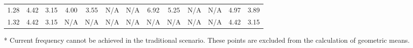 \documentclass[prodmode,acmtrets]{acmsmall} %
\begin{document}
\begin{table}[tbp]
{\begin{threeparttable}
\begin{tabular}{|c|cc|cc|cc|cc|cc||cc|}
     1.28 & 4.42	& 3.15   & 4.00 &	3.55 &	 N/A\tnote{*}	    &   N/A\tnote{*}     &	6.92 &	 5.25  &	 N/A\tnote{*}	  & N/A\tnote{*} & 4.97& 3.89\\
     1.32 & 4.42	& 3.15   & N/A\tnote{*}	  &	 N/A\tnote{*}	    &	 N/A\tnote{*}	    &	 N/A\tnote{*}   & N/A\tnote{*}   & N/A\tnote{*}    &    N/A\tnote{*}   & N/A\tnote{*} & 4.42	& 3.15 \\
     \hline
   \end{tabular}
   \normalsize
   \begin{tablenotes}
   \scriptsize
    \item[*] Current frequency cannot be achieved in the traditional scenario. These points are excluded from the calculation of geometric means.
   \end{tablenotes}
   \end{threeparttable}}
   \label{Table:AreaFrequency}
 \end{table}
%
\end{document}
